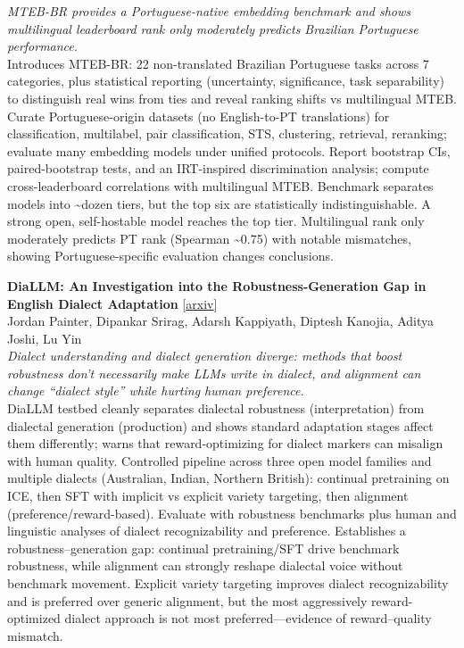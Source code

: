 \documentclass[12pt,letterpaper]{article}
\begin{document}
{\small\textit{MTEB-BR provides a Portuguese-native embedding benchmark and shows multilingual leaderboard rank only moderately predicts Brazilian Portuguese performance.}}\\[1pt]
{\footnotesize Introduces MTEB-BR: 22 non-translated Brazilian Portuguese tasks across 7 categories, plus statistical reporting (uncertainty, significance, task separability) to distinguish real wins from ties and reveal ranking shifts vs multilingual MTEB. Curate Portuguese-origin datasets (no English-to-PT translations) for classification, multilabel, pair classification, STS, clustering, retrieval, reranking; evaluate many embedding models under unified protocols. Report bootstrap CIs, paired-bootstrap tests, and an IRT-inspired discrimination analysis; compute cross-leaderboard correlations with multilingual MTEB. Benchmark separates models into \textasciitilde{}dozen tiers, but the top six are statistically indistinguishable. A strong open, self-hostable model reaches the top tier. Multilingual rank only moderately predicts PT rank (Spearman \textasciitilde{}0.75) with notable mismatches, showing Portuguese-specific evaluation changes conclusions.}

\medskip

{\small\textbf{DiaLLM: An Investigation into the Robustness-Generation Gap in English Dialect Adaptation}} {\scriptsize[\href{https://arxiv.org/abs/2607.07669}{arxiv}]}\\
{\scriptsize Jordan Painter, Dipankar Srirag, Adarsh Kappiyath, Diptesh Kanojia, Aditya Joshi, Lu Yin}\\

{\small\textit{Dialect understanding and dialect generation diverge: methods that boost robustness don't necessarily make LLMs write in dialect, and alignment can change ``dialect style'' while hurting human preference.}}\\[1pt]
{\footnotesize DiaLLM testbed cleanly separates dialectal robustness (interpretation) from dialectal generation (production) and shows standard adaptation stages affect them differently; warns that reward-optimizing for dialect markers can misalign with human quality. Controlled pipeline across three open model families and multiple dialects (Australian, Indian, Northern British): continual pretraining on ICE, then SFT with implicit vs explicit variety targeting, then alignment (preference/reward-based). Evaluate with robustness benchmarks plus human and linguistic analyses of dialect recognizability and preference. Establishes a robustness--generation gap: continual pretraining/SFT drive benchmark robustness, while alignment can strongly reshape dialectal voice without benchmark movement. Explicit variety targeting improves dialect recognizability and is preferred over generic alignment, but the most aggressively reward-optimized dialect approach is not most preferred---evidence of reward--quality mismatch.}
\end{document}
